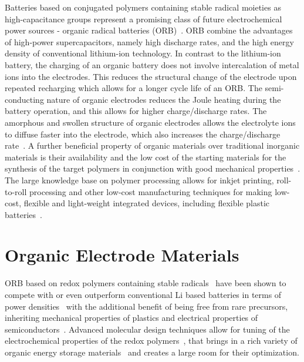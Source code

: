 Batteries based on conjugated polymers containing stable radical moieties as high-capacitance groups represent a promising class of future electrochemical power sources - organic radical batteries (ORB)~\cite{nakahara2002_cpl, nishide2004_electact,xie2021_mathoriz,Rohland_2021}. ORB combine the advantages of high-power supercapacitors, namely high discharge rates, and the high energy density of conventional lithium-ion technology. In contrast to the lithium-ion battery, the charging of an organic battery does not involve intercalation of metal ions into the electrodes. This reduces the structural change of the electrode upon repeated recharging which allows for a longer cycle life of an ORB. The semi-conducting nature of organic electrodes reduces the Joule heating during the battery operation, and this allows for higher charge/discharge rates. The amorphous and swollen structure of organic electrodes allows the electrolyte ions to diffuse faster into the electrode, which also increases the charge/discharge rate~\cite{nishide_2009}. A further beneficial property of organic materials over traditional inorganic materials is their availability and the low cost of the starting materials for the synthesis of the target polymers in conjunction with good mechanical properties~\cite{janoschka2012_advmater, muench2016_chemrev, friebe2017_topcurrchem}. The large knowledge base on polymer processing allows for inkjet printing, roll-to-roll processing and other low-cost manufacturing techniques for making low-cost, flexible and light-weight integrated devices, including flexible plastic batteries~\cite{janoschka2012_advmater,nishide_2009}. 

\section{Organic Electrode Materials}
\label{sec:ORB_materials}
ORB based on redox polymers containing stable radicals~\cite{nakahara2002_cpl} have been shown to compete with or even outperform  conventional Li based batteries in terms of power densities~\cite{IWASA2007} with the additional benefit of being free from rare precursors, inheriting mechanical properties of plastics and electrical properties of semiconductors~\cite{friebe2017_topcurrchem,Casado2021,Goujon2021}. Advanced molecular design techniques allow for tuning of the electrochemical properties of the redox polymers~\cite{Janoschka2017}, that brings in a rich variety of organic energy storage materials~\cite{Xie2021,Vereshchagin2022,Janoschka2017a} and creates a large room for their optimization. 

